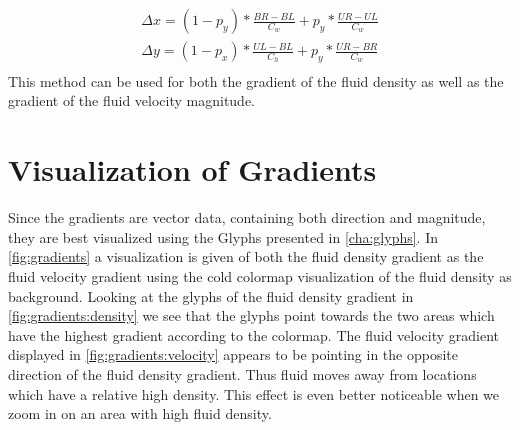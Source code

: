 \begin{align}\label{eq:gradient}
	\Delta x = (1 - p_y) * \frac{BR - BL}{C_w} +
      p_y * \frac{UR - UL}{C_w}\\
	\Delta y = (1 - p_x) * \frac{UL - BL}{C_h} +
      p_y * \frac{UR - BR}{C_w}\\
\end{align}
This method can be used for both the gradient of the fluid density as well as the gradient of the fluid velocity magnitude.

\section{Visualization of Gradients} %
\label{sec:visualization_of_gradients}
Since the gradients are vector data, containing both direction and magnitude, they are best visualized using the Glyphs presented in \cref{cha:glyphs}. In \cref{fig:gradients} a visualization is given of both the fluid density gradient as the fluid velocity gradient using the cold colormap visualization of the fluid density as background. Looking at the glyphs of the fluid density gradient in \cref{fig:gradients:density} we see that the glyphs point towards the two areas which have the highest gradient according to the colormap. The fluid velocity gradient displayed in \cref{fig:gradients:velocity} appears to be pointing in the opposite direction of the fluid density gradient. Thus fluid moves away from locations which have a relative high density. This effect is even better noticeable when we zoom in on an area with high fluid density.
